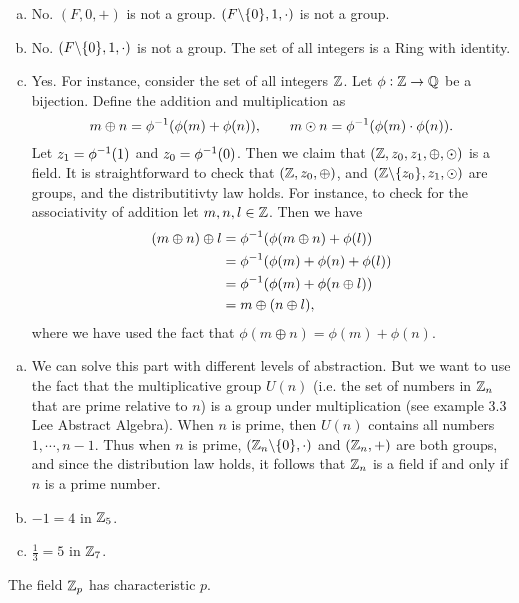 \begin{problem}
	\begin{solution}
		\begin{enumerate}[(a)]
			\item No. $ (F,0,+) $ is not a group. $ (F\backslash\{0\},1,\cdot) $ is not a group.
			\item No. $ (F\backslash\{0\},1,\cdot) $ is not a group. The set of all integers is a Ring with identity.
			\item Yes. For instance, consider the set of all integers $ \mathbb{Z} $. Let $ \phi:\mathbb{Z}\to \mathbb{Q} $ be a bijection. Define the addition and multiplication as
			\[ m \oplus n = \phi^{-1}(\phi(m) + \phi(n)),\qquad m\odot n = \phi^{-1}(\phi(m)\cdot\phi(n)). \]
			Let $ z_1 = \phi^{-1}(1) $ and $ z_0= \phi^{-1}(0) $. Then we claim that $ (\mathbb{Z},z_0,z_1,\oplus,\odot) $ is a field. It is straightforward to check that $ (\mathbb{Z},z_0,\oplus) $, and $ (\mathbb{Z}\backslash\{z_0\},z_1,\odot) $ are groups, and the distributitivty law holds. For instance, to check for the associativity of addition let $ m,n,l \in \mathbb{Z} $. Then we have
			\begin{align*}
				(m\oplus n)\oplus l &= \phi^{-1}(\phi(m\oplus n) + \phi(l)) \\
				&= \phi^{-1}(\phi(m) + \phi(n) + \phi(l)) \\
				&= \phi^{-1}(\phi(m) + \phi(n\oplus l)) \\
				&= m \oplus (n\oplus l),
			\end{align*}
			where we have used the fact that $ \phi(m\oplus n) = \phi(m) + \phi(n) $.
		\end{enumerate}
	\end{solution}
\end{problem}


\begin{problem}
	\begin{solution}
		\begin{enumerate}[(a)]
			\item We can solve this part with different levels of abstraction. But we want to use the fact that the multiplicative group $ U(n) $ (i.e. the set of numbers in $ \mathbb{Z}_n $ that are prime relative to $ n $) is a group under multiplication (see example 3.3 Lee Abstract Algebra). When $ n $ is prime, then $ U(n) $ contains all numbers $ 1,\cdots,n-1 $. Thus when $ n $ is prime, $ (\mathbb{Z}_n\backslash\{0\}, \cdot) $ and $ (\mathbb{Z}_n,+) $ are both groups, and since the distribution law holds, it follows that $ \mathbb{Z}_n $ is a field if and only if $ n $ is a prime number. 
			\item $ -1 = 4 $ in $ \mathbb{Z}_5 $.
			\item $ \frac{1}{3} = 5 $ in $ \mathbb{Z}_7 $.
		\end{enumerate}
	\end{solution}
\end{problem}
\begin{observation}
	The field $ \mathbb{Z}_p $ has characteristic $ p $.
\end{observation}


